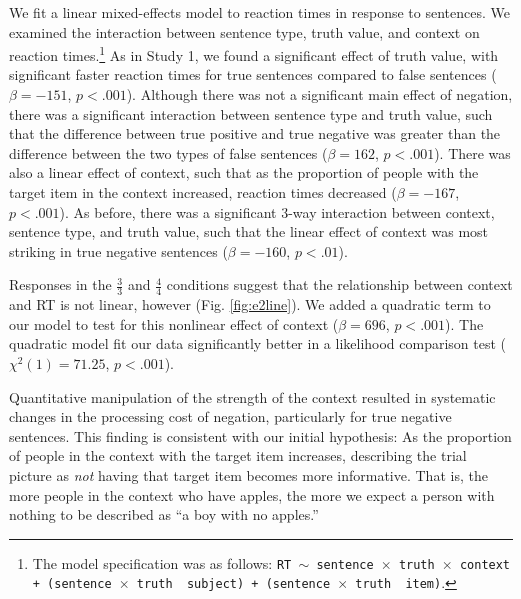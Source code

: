\documentclass[10pt,letterpaper]{article}
\begin{document}
We fit a linear mixed-effects model to reaction times in response to sentences.  We examined the interaction between sentence type, truth value, and context on reaction times.\footnote{The model specification was as follows: \texttt{RT $\sim$ sentence~$\times$~truth~$\times$~context + (sentence~$\times$~truth~\textbar~subject) +  (sentence~$\times$~truth~\textbar~item)}.}  As in Study 1, we found a significant effect of truth value, with significant faster reaction times for true sentences compared to false sentences ($\beta= -151$, $p< .001$).  Although there was not a significant main effect of negation, there was a significant interaction between sentence type and truth value, such that the difference between true positive and true negative was greater than the difference between the two types of false sentences ($\beta= 162$, $p< .001$).  There was also a linear effect of context, such that as the proportion of people with the target item in the context increased, reaction times decreased ($\beta= -167$, $p< .001$).  As before, there was a significant 3-way interaction between context, sentence type, and truth value, such that the linear effect of context was most striking in true negative sentences ($\beta= -160$, $p< .01$).

Responses in the $\frac{3}{3}$ and $\frac{4}{4}$ conditions suggest that the relationship between context and RT is not linear, however (Fig. \ref{fig:e2line}).  We added a quadratic term to our model to test for this nonlinear effect of context ($\beta= 696 $, $p< .001$).  The quadratic model fit our data significantly better in a likelihood comparison test ($\chi^{2}(1) = 71.25$, $p<.001$).  

Quantitative manipulation of the strength of the context resulted in systematic changes in the processing cost of negation, particularly for true negative sentences.  This finding is consistent with our initial hypothesis: As the proportion of people in the context with the target item increases, describing the trial picture as \emph{not} having that target item becomes more informative.  That is, the more people in the context who have apples, the more we expect a person with nothing to be described as ``a boy with no apples.'' 
\end{document}

